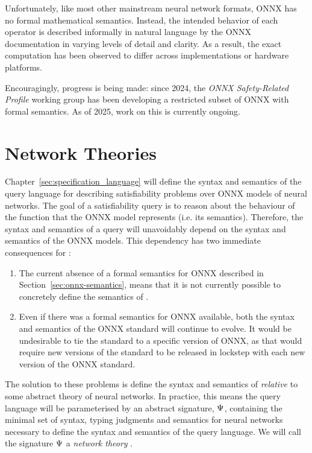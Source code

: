 Unfortunately, like most other mainstream neural network formats, ONNX has no formal mathematical semantics. 
Instead, the intended behavior of each operator is described informally in natural language by the ONNX documentation in varying levels of detail and clarity. 
As a result, the exact computation has been observed to differ across implementations or hardware platforms.

Encouragingly, progress is being made: since 2024, the \emph{ONNX Safety-Related Profile} working group has been developing a restricted subset of ONNX with formal semantics. 
As of 2025, work on this is currently ongoing.

\section{Network Theories}
\label{sec:network-theory}

Chapter~\ref{sec:specification_language} will define the syntax and semantics of the \vnnlib{} query language for describing satisfiability problems over ONNX models of neural networks.
The goal of a satisfiability query is to reason about the behaviour of the function that the ONNX model represents (i.e. its semantics).
Therefore, the syntax and semantics of a query will unavoidably depend on the syntax and semantics of the ONNX models.
This dependency has two immediate consequences for \vnnlib{}:
\begin{enumerate}
\item The current absence of a formal semantics for ONNX described in Section~\ref{sec:onnx-semantics}, means that it is not currently possible to concretely define the semantics of \vnnlib{}.
\item Even if there was a formal semantics for ONNX available, both the syntax and semantics of the ONNX standard will continue to evolve. 
It would be undesirable to tie the \vnnlib{} standard to a specific version of ONNX, as that would require new versions of the \vnnlib{} standard to be released in lockstep with each new version of the ONNX standard.
\end{enumerate}
The solution to these problems is define the syntax and semantics of \vnnlib{} \emph{relative} to some abstract theory of neural networks.
In practice, this means the \vnnlib{} query language will be parameterised by an abstract signature, $\Psi$, containing the minimal set of syntax, typing judgments and semantics for neural networks necessary to define the syntax and semantics of the query language.
We will call the signature $\Psi$ a \emph{network theory} . 


